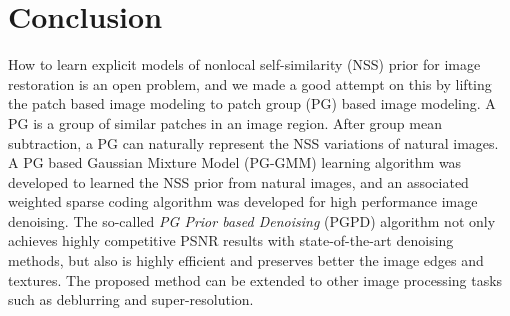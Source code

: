 \section{Conclusion}
How to learn explicit models of nonlocal self-similarity (NSS) prior for image restoration is an open problem, and we made a good attempt on this by lifting the patch based image modeling to patch group (PG) based image modeling. A PG is a group of similar patches in an image region. After group mean subtraction, a PG can naturally represent the NSS variations of natural images. A PG based Gaussian Mixture Model (PG-GMM) learning algorithm was developed to learned the NSS prior from natural images, and an associated weighted sparse coding algorithm was developed for high performance image denoising. The so-called \textsl{PG Prior based Denoising} (PGPD) algorithm not only achieves highly competitive PSNR results with state-of-the-art denoising methods, but also is highly efficient and preserves better the image edges and textures. The proposed method can be extended to other image processing tasks such as deblurring and super-resolution.
